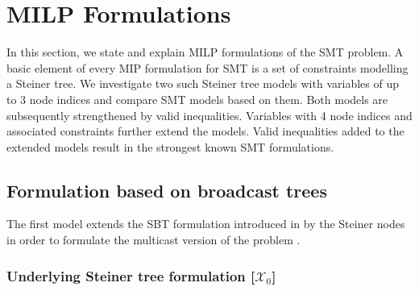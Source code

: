 \section{MILP Formulations}
\label{sec:ILP}

In this section, we state and explain MILP formulations of the SMT problem.
A basic element of every MIP formulation for SMT is a set of constraints modelling a Steiner tree.
We investigate two such Steiner tree models with variables of up to 3 node indices and compare SMT models based on them.
Both models are subsequently strengthened by valid inequalities.
Variables with 4 node indices and associated constraints further extend the models.
Valid inequalities added to the extended models result in the strongest known SMT formulations.

\subsection{Formulation based on broadcast trees}

The first model extends the SBT formulation introduced in \cite{Haugland12Dual} by the Steiner nodes in order to formulate the multicast version of the problem \cite{ivanova16isco}.

\subsubsection{Underlying Steiner tree formulation [$\mathcal{X}_0$]}

